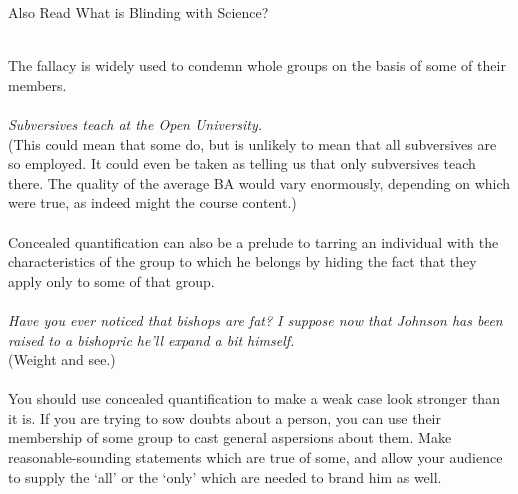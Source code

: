 \documentclass[a4paper,12pt,single,pdftex]{scrartcl}
\begin{document}
    
      

      
        Also Read  What is Blinding with Science?
      
    
    
       
    \\

    
      The fallacy is widely used to condemn whole groups on the basis of some of their members.
    \\

    
       
    \\

    
      {\em Subversives teach at the Open University.}
    \\

    
      (This could mean that some do, but is unlikely to mean that all subversives are so employed. It could even be taken as telling us that only subversives teach there. The quality of the average BA would vary enormously, depending on which were true, as indeed might the course content.)
    \\

    
       
    \\

    
      Concealed quantification can also be a prelude to tarring an individual with the characteristics of the group to which he belongs by hiding the fact that they apply only to some of that group.
    \\

    
       
    \\

    
      {\em Have you ever noticed that bishops are fat? I suppose now that Johnson has been raised to a bishopric he’ll expand a bit himself.}
    \\

    
      (Weight and see.)
    \\

    
       
    \\

    
      You should use concealed quantification to make a weak case look stronger than it is. If you are trying to sow doubts about a person, you can use their membership of some group to cast general aspersions about them. Make reasonable-sounding statements which are true of some, and allow your audience to supply the ‘all’ or the ‘only’ which are needed to brand him as well.
    \\
\end{document}
